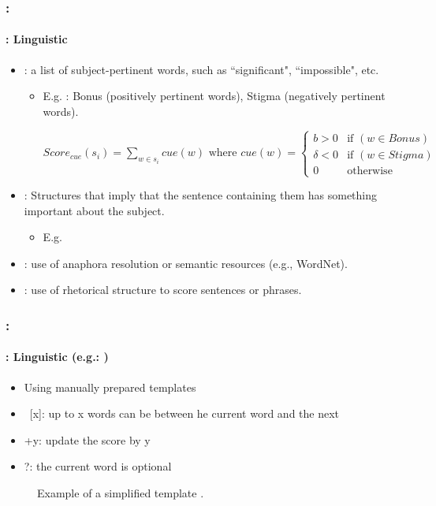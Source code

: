 \documentclass[xcolor=table]{beamer}
\begin{document}
\begin{frame}
	\frametitle{\insertshortsubtitle: \insertsection}
	\framesubtitle{\insertsubsection: Linguistic}
	
	\begin{itemize}
		\item {}: a list of subject-pertinent words, such as ``significant", ``impossible", etc.
		\begin{itemize}
			\item E.g. \cite{69-edmundson}: Bonus (positively pertinent words), Stigma (negatively pertinent words).
			
			$Score_{cue}(s_i) = \sum_{w \in s_i}{cue(w)}
			\text{ where }
			cue(w) = \left\lbrace 
			\begin{array}{ll}
			b > 0 & \text{if } (w \in Bonus) \\
			\delta < 0 & \text{if } (w \in Stigma) \\
			0 & \text{otherwise} 
			\end{array} 
			\right. $
		\end{itemize}
		\item {}: Structures that imply that the sentence containing them has something important about the subject.
		\begin{itemize}
			\item E.g. 
		\end{itemize}
		\item {}: use of anaphora resolution or semantic resources (e.g., WordNet).
		\item {}: use of rhetorical structure to score sentences or phrases.
	\end{itemize}
	
\end{frame}

\begin{frame}
	\frametitle{\insertshortsubtitle: \insertsection}
	\framesubtitle{\insertsubsection: Linguistic (e.g.: \cite{81-paice})}
	
	\begin{itemize}
		\item Using manually prepared templates
		\item\ [x]: up to x words can be between he current word and the next
		\item +y: update the score by y
		\item ?: the current word is optional
	\end{itemize}

	\begin{figure}[!ht]
		\begin{center}
			\caption{Example of a simplified template \cite{81-paice}.}
			\label{fig:paice-template}
		\end{center}
	\end{figure}
	
\end{frame}
\end{document}
